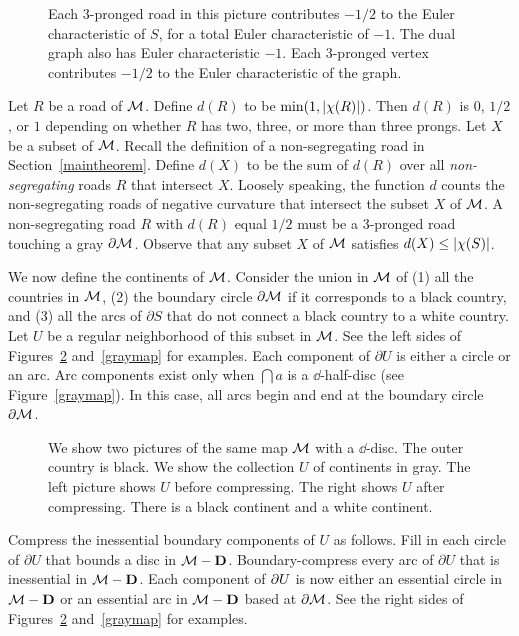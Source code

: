\begin{figure}
\caption{
Each 3-pronged road in this picture contributes $-1/2$ to the Euler characteristic of $S$, for a total Euler characteristic of $-1$.  The dual graph also has Euler characteristic $-1$.  Each 3-pronged vertex contributes $-1/2$ to the Euler characteristic of the graph.
}
\label{dual graph}
\end{figure}

Let $R$ be a road of $\mathcal{M}$.  Define $d(R)$ to be $\min(1,| \chi (R) |)$.  Then $d(R)$ is $0$, $1/2$, or $1$ depending on whether $R$ has two, three, or more than three prongs.  Let $X$ be a subset of $\mathcal{M}$.  Recall the definition of a non-segregating road in Section~\ref{maintheorem}.  Define $d(X)$ to be the sum of $d(R)$ over all \emph{non-segregating} roads $R$ that intersect $X$.  Loosely speaking, the function $d$ counts the non-segregating roads of negative curvature that intersect the subset $X$ of $\mathcal{M}$.  A non-segregating road $R$ with $d(R)$ equal $1/2$ must be a 3-pronged road touching a gray $\partial\mathcal{M}$.  Observe that any subset $X$ of $\mathcal{M}$ satisfies $d(X)\leq| \chi (S) |$.

We now define the continents of $\mathcal{M}$.  Consider the union in $\mathcal{M}$ of (1) all the countries in $\mathcal{M}$, (2) the boundary circle $\partial \mathcal{M}$ if it corresponds to a black country, and (3) all the arcs of $\partial S$ that do not connect a black country to a white country.  Let $U$ be a regular neighborhood of this subset in $\mathcal{M}$.  See the left sides of Figures~\ref{map1} and~\ref{graymap} for examples.  Each component of $\partial U$ is either a circle or an arc.  Arc components exist only when $\dint{a}$ is a $\dd$-half-disc (see Figure~\ref{graymap}).  In this case, all arcs begin and end at the boundary circle $\partial \mathcal{M}$.

\begin{figure}
%
\hspace{.5in}%
\caption{
We show two pictures of the same map $\mathcal{M}$ with a $\dd$-disc.  The outer country is black.  We show the collection $U$ of continents in gray.  The left picture shows $U$ before compressing.  The right shows $U$ after compressing.  There is a black continent and a white continent.
}
\label{map1}
\end{figure}

Compress the inessential boundary components of $U$
as follows.
Fill in each circle of $\partial U$ that bounds a disc in $\mathcal{M}-\mathbf{D}$.
Boundary-compress every arc of $\partial U$ that is inessential
in $\mathcal{M}-\mathbf{D}$.
Each component of $\partial U$ is now either an essential circle in 
$\mathcal{M}-\mathbf{D}$ or an essential arc in $\mathcal{M}-\mathbf{D}$ based at $\partial \mathcal{M}$.  
See the right sides of Figures~\ref{map1} and~\ref{graymap} for
examples.

